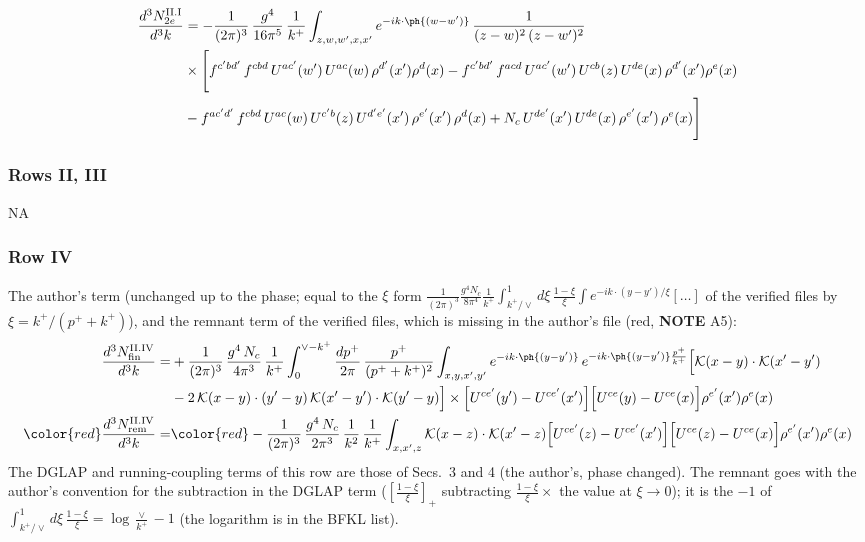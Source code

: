 \begin{align}
\frac{d^{3}N^{\rm II.I}_{2e}}{d^{3}k}&= -\frac{1}{(2\pi)^{3}}\,\frac{g^{4}}{16\pi^{5}}\,\frac{1}{k^{+}}\int_{z,w,w^{\prime},x,x^{\prime}}e^{-ik\cdot\ph{(w-w^{\prime})}}\,\frac{1}{(z-w)^{2}\,(z-w^{\prime})^{2}}\notag\\
&\times\Bigg[f^{c^{\prime}bd^{\prime}}\,f^{cbd}\, U^{ac^{\prime}}(w^{\prime})\,U^{ac}(w)\,\rho^{d^{\prime}}(x^{\prime})\rho^{d}(x)- f^{c^{\prime}bd^{\prime}}\,f^{acd}\,U^{ac^{\prime}}(w^{\prime})\,U^{cb}(z)\,U^{de}(x)\,\rho^{d^{\prime}}(x^{\prime})\rho^{e}(x) \notag \\ & -f^{ac^{\prime}d^{\prime}}\,f^{cbd}\,U^{ac}(w)\,U^{c^{\prime}b}(z)\,U^{d^{\prime}e^{\prime}}(x^{\prime})\,\rho^{e^{\prime}}(x^{\prime})\,\rho^{d}(x) +N_{c}\,U^{de^{\prime}}(x^{\prime})\,U^{de}(x)\,\rho^{e^{\prime}}(x^{\prime})\,\rho^{e}(x)\Bigg]\label{eq:B-II2e}
\end{align}
\subsubsection*{Rows II, III} \textsc{NA}
\subsubsection*{Row IV}
The author's term (unchanged up to the phase; equal to the $\xi$ form $\frac{1}{(2\pi)^{3}}\frac{g^{4}N_{c}}{8\pi^{4}}\frac{1}{k^{+}}\int_{k^{+}/\vee}^{1}d\xi\,\frac{1-\xi}{\xi}\int e^{-ik\cdot(y-y')/\xi}[\dots]$ of the verified files by $\xi=k^{+}/(p^{+}+k^{+})$), and the remnant term of the verified files, which is missing in the author's file (red, \textbf{NOTE} A5):
\begin{align}
\frac{d^{3}N^{\rm II.IV}_{\rm fin}}{d^{3}k}= &  +\frac{1}{(2\pi)^{3}}\,\frac{g^{4}\,N_{c}}{4\pi^{3}}\,\frac{1}{k^{+}}\int_{0}^{\vee-k^{+}}\frac{dp^{+}}{2\pi}\,\frac{p^{+}}{(p^{+}+k^{+})^{2}}\int_{x,y,x',y'}e^{-ik\cdot\ph{(y-y')}}\,e^{-ik\cdot\ph{(y-y')}\frac{p^{+}}{k^{+}}}\Big[\mathcal{K}(x-y)\cdot\mathcal{K}(x'-y')\notag \\ & -2\,\mathcal{K}(x-y)\cdot(y'-y)\,\mathcal{K}(x'-y')\cdot\mathcal{K}(y'-y)\Big]\times\Big[U^{ce'}(y') - U^{ce'}(x')\Big]\Big[U^{ce}(y) - U^{ce}(x)\Big]\rho^{e'}(x')\rho^{e}(x)\label{eq:B-II4}\\
{\color{red}\frac{d^{3}N^{\rm II.IV}_{\rm rem}}{d^{3}k}}=&{\color{red}-\frac{1}{(2\pi)^{3}}\,\frac{g^{4}\,N_{c}}{2\pi^{3}}\,\frac{1}{k^{2}}\,\frac{1}{k^{+}}\int_{x,x',z}\mathcal{K}(x-z)\cdot\mathcal{K}(x'-z)\Big[U^{ce'}(z)-U^{ce'}(x')\Big]\Big[U^{ce}(z)-U^{ce}(x)\Big]\rho^{e'}(x')\rho^{e}(x)}\label{eq:B-II4rem}
\end{align}
The DGLAP and running-coupling terms of this row are those of Secs.~3 and 4 (the author's, phase changed). The remnant goes with the author's convention for the subtraction in the DGLAP term ($[\frac{1-\xi}{\xi}]_{+}$ subtracting $\frac{1-\xi}{\xi}\times$ the value at $\xi\to0$); it is the $-1$ of $\int_{k^{+}/\vee}^{1}d\xi\,\frac{1-\xi}{\xi}=\log\frac{\vee}{k^{+}}-1$ (the logarithm is in the BFKL list).
